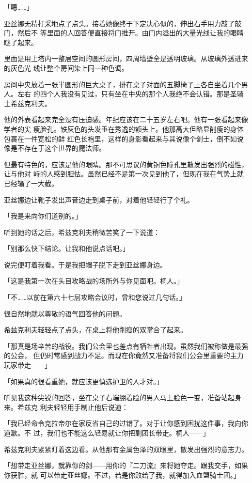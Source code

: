 \documentclass[11pt]{book}
\begin{document}
「嗯……」

亚丝娜无精打采地点了点头。接着她像终于下定决心似的，伸出右手用力敲了敲门，然后不
等里面的人回答便直接将门推开。由门内溢出的大量光线让我的眼睛瞇了起来。

里面是用上塔内一整层空间的圆形房间，四周墙壁全是透明玻璃。从玻璃外透进来的灰色光
线让整个房间染上同一种色调。

房间中央放着一张半圆形的巨大桌子，排在桌子对面的五脚椅子上各自坐着几个男人。左右
的四个人我没有见过，只有坐在中央的那个人我绝不会认错。那是圣骑士希兹克利夫。

他的外表看起来完全没有压迫感。年纪应该在二十五岁左右吧。他有一张看起来像学者的尖
瘦脸孔。铁灰色的头发垂在秀逸的额头上。他那高大但略显削瘦的身体包裹在一件宽松的鲜
红色长袍里，这样的身影看起来与其说像个剑士，倒不如说像是不存在于这个世界的魔法师。

但最有特色的，应该是他的眼睛。那不可思议的黄铜色瞳孔里散发出强烈的磁性，让与他对
峙的人感到胆怯。虽然已经不是第一次见到他了，但现在我在气势上就已经输了一大截。

亚丝娜边让靴子发出声音边走到桌子前，对着他轻轻行了个礼。

「我是来向你们道别的。」

听到她的话之后，希兹克利夫稍微苦笑了一下说道：

「别那么快下结论。让我和他说点话吧。」

说完便盯着我看。于是我把帽子脱下走到亚丝娜身边。

「这是我第一次在头目攻略战的场所外与你见面吧。桐人。」

「不……以前在第六十七层攻略会议时，曾和您说过几句话。」

很自然地就以尊敬的语气回答他的问题。

希兹克利夫轻轻点了点头，在桌上将他削瘦的双掌合了起来。

「那真是场辛苦的战役。我们公会里也差点有牺牲者出现。虽然我们被称做是最强的公会，
但仍时常感到战力不足。而现在你竟然又准备将我们公会里重要的主力玩家带走——」

「如果真的很看重她，就应该更慎选护卫的人才对。」

听见我这种尖锐的回答，坐在桌子右端绷着脸的男人马上脸色一变，准备站起身来。希兹克
利夫轻轻用手制止他后说道：

「我已经命令克拉帝尔在家反省自己的过错了。对于让你感到困扰这件事，我向你道歉。不
过，我们也不能这么轻易就让你把副团长带走。桐人——」

希兹克利夫紧紧盯着这边看。从他那有金属色泽的双眼里，散发出强烈的意志力。

「想带走亚丝娜，就靠你的剑——用你的『二刀流』来将她夺走。跟我交手，如果你获胜，就
可以带走亚丝娜。不过，若是你败给了我，就得加入血盟骑士团。」
\end{document}
